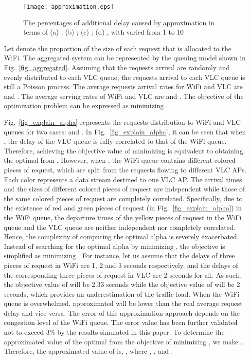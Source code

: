 \documentclass[10pt,journal]{IEEEtran}
\begin{document}
\begin{figure*}
\centering
\texttt{[image: approximation.eps]}
\vspace{-10pt}
\caption{The percentages of additional delay caused by approximation in terms of (a) ; (b) ; (c) ; (d) , with  varied from 1 to 10}
\label{fig_approximation}
\vspace{-8pt}
\end{figure*}

Let  denote the proportion of the size of each request that is allocated to the WiFi. The aggregated system can be represented by the queuing model shown in Fig.~\ref{fig_aggregated}. Assuming that the requests arrival are randomly and evenly distributed to each VLC queue, the requests arrival to each VLC queue is still a Poisson process. The average requests arrival rates for WiFi and VLC are  and . The average serving rates of WiFi and VLC are  and . The objective of the optimization problem can be expressed as minimizing .

Fig.~\ref{fig_explain_alpha} represents the requests distribution to WiFi and VLC queues for two cases:  and . In Fig.~\ref{fig_explain_alpha}, it can be seen that when , the delay of the VLC queue is fully correlated to that of the WiFi queue. Therefore, achieving the objective value of minimizing  is equivalent to obtaining the optimal  from . However, when , the WiFi queue contains different colored pieces of request, which are split from the requests flowing to different VLC APs. Each color represents a data stream destined to one VLC AP. The arrival times and the sizes of different colored pieces of request are independent while those of the same colored pieces of request are completely correlated. Specifically, due to the existence of red and green pieces of request (in Fig.~\ref{fig_explain_alpha}) in the WiFi queue, the departure times of the yellow pieces of request in the WiFi queue and the VLC queue are neither independent nor completely correlated. Hence, the complexity of computing the optimal alpha is severely exacerbated. Instead of searching for the optimal alpha by minimizing , the objective is simplified as minimizing . For instance, let us assume that the delays of three pieces of request in WiFi are 1, 2 and 3 seconds respectively, and the delays of the corresponding three pieces of request in VLC are 2 seconds for all. As such, the objective value of  will be 2.33 seconds while the objective value of  will be 2 seconds, which provides an underestimation of the traffic load. When the WiFi queue is overwhelmed, approximated  will be lower than the real average request delay and vice versa. The error of this approximation approach depends on the congestion level of the WiFi queue. The error value has been further validated not to exceed 3\% by the results simulated in this paper. To determine the approximated value of the optimal  from the objective of minimizing , we make . Therefore, the approximated value of  is, , where , , and .
\end{document}
